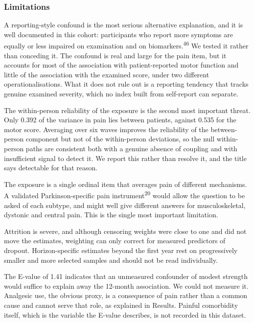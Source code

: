 \documentclass[
  english,
  12pt,
]{article}
\begin{document}
\subsubsection{Limitations}\label{limitations}

A reporting-style confound is the most serious alternative explanation, and it is well documented in this cohort: participants who report more symptoms are equally or less impaired on examination and on biomarkers.\textsuperscript{46} We tested it rather than conceding it. The confound is real and large for the pain item, but it accounts for most of the association with patient-reported motor function and little of the association with the examined score, under two different operationalisations. What it does not rule out is a reporting tendency that tracks genuine examined severity, which no index built from self-report can separate.

The within-person reliability of the exposure is the second most important threat. Only 0.392 of the variance in pain lies between patients, against 0.535 for the motor score. Averaging over six waves improves the reliability of the between-person component but not of the within-person deviations, so the null within-person paths are consistent both with a genuine absence of coupling and with insufficient signal to detect it. We report this rather than resolve it, and the title says detectable for that reason.

The exposure is a single ordinal item that averages pain of different mechanisms. A validated Parkinson-specific pain instrument\textsuperscript{20} would allow the question to be asked of each subtype, and might well give different answers for musculoskeletal, dystonic and central pain. This is the single most important limitation.

Attrition is severe, and although censoring weights were close to one and did not move the estimates, weighting can only correct for measured predictors of dropout. Horizon-specific estimates beyond the first year rest on progressively smaller and more selected samples and should not be read individually.

The E-value of 1.41 indicates that an unmeasured confounder of modest strength would suffice to explain away the 12-month association. We could not measure it. Analgesic use, the obvious proxy, is a consequence of pain rather than a common cause and cannot serve that role, as explained in Results. Painful comorbidity itself, which is the variable the E-value describes, is not recorded in this dataset.
\end{document}
